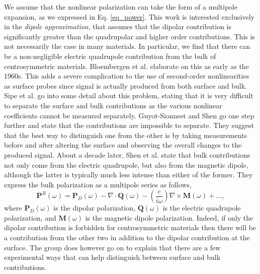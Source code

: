 We assume that the nonlinear polarization can take the form of a multipole
expansion, as we expressed in Eq. \eqref{eq_power}. This work is interested
exclusively in the \emph{dipole approximation}, that assumes that the dipolar
contribution is significantly greater than the quadrupolar and higher order
contributions. This is not necessarily the case in many materials. In
particular, we find that there can be a non-negligible electric quadrupole
contribution from the bulk of centrosymmetric materials. Bloembergen et al.
\cite{PhysRev.174.813} elaborate on this as early as the 1960s. This adds a
severe complication to the use of second-order nonlinearities as surface probes
since signal is actually produced from both surface and bulk. Sipe et al.
\cite{sipe1987fundamental} go into some detail about this problem, stating that
it is very difficult to separate the surface and bulk contributions as the
various nonlinear coefficients cannot be measured separately. Guyot-Sionnest and
Shen \cite{PhysRevB.38.7985} go one step further and state that the
contributions are impossible to separate. They suggest that the best way to
distinguish one from the other is by taking measurements before and after
altering the surface and observing the overall changes to the produced signal.
About a decade later, Shen et al. \cite{shen1999surface} state that bulk
contributions not only come from the electric quadrupole, but also from the
magnetic dipole, although the latter is typically much less intense than either
of the former. They express the bulk polarization as a multipole series as
follows,
\begin{equation}
\mathbf{P}^{B}(\omega)
= \mathbf{P}_{D}(\omega)
- \nabla\cdot\mathbf{Q}(\omega)
- \left(\frac{c}{i\omega}\right)\nabla\times\mathbf{M}(\omega)
+ \ldots,
\end{equation}
where $\mathbf{P}_{D}(\omega)$ is the dipolar polarization, $\mathbf{Q}(\omega)$
is the electric quadrupole polarization, and $\mathbf{M}(\omega)$ is the
magnetic dipole polarization. Indeed, if only the dipolar contribution is
forbidden for centrosymmetric materials then there will be a contribution from
the other two in addition to the dipolar contribution at the surface. The group
does however go on to explain that there are a few experimental ways that can
help distinguish between surface and bulk contributions.

